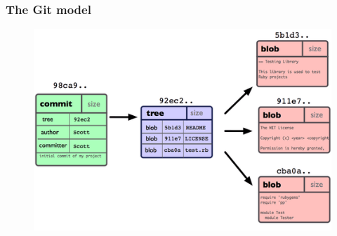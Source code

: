 \documentclass[11pt]{beamer}
\begin{document}
\begin{frame}[fragile]
\frametitle{The Git model}

\begin{figure}[htp]
 \centering
 \includegraphics[scale=0.45]{git_objects.png}
\end{figure}






\end{frame}



\end{document}
